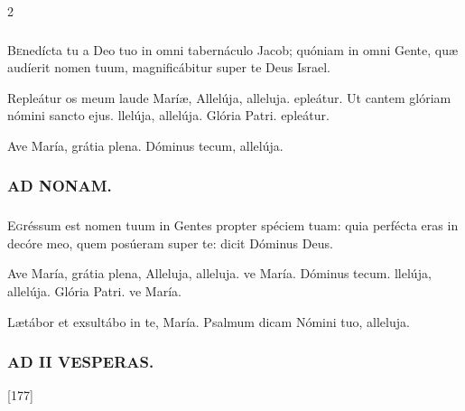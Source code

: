 \documentclass[9pt,twoside]{extarticle}
\begin{document}
\begin{multicols}{2}
\subsubsection*{}
\lettrine{B}enedícta tu a Deo tuo in omni tabernáculo Jacob; quóniam in omni Gente, quæ audíerit nomen tuum, magnificábitur super te Deus Israel.

\begin{tightlist}{}
\item {} Repleátur os meum laude Maríæ, \textred{*} Allelúja, alleluja. epleátur.  Ut cantem glóriam nómini sancto ejus. llelúja, allelúja. Glória Patri. epleátur.
\item {} Ave María, grátia plena.  Dóminus tecum, allelúja.
\end{tightlist}

\subsubsection*{\center \textsc{AD NONAM.}}
\subsubsection*{}
\lettrine{E}gréssum est nomen tuum in Gentes propter spéciem tuam: quia perfécta eras in decóre meo, quem posúeram super te: dicit Dóminus Deus.

\begin{tightlist}{}
\item {} Ave María, grátia plena, \textred{*} Alleluja, alleluja. ve María.  Dóminus tecum. llelúja, allelúja. Glória Patri. ve María.
\item {} Lætábor et exsultábo in te, María.  Psalmum dicam Nómini tuo, alleluja.
\end{tightlist}

\subsubsection*{\center \textsc{AD II VESPERAS.}}
\begin{tightlist}{}
\item {}
\item {} [177]
\end{tightlist}


\end{multicols}
\end{document}

